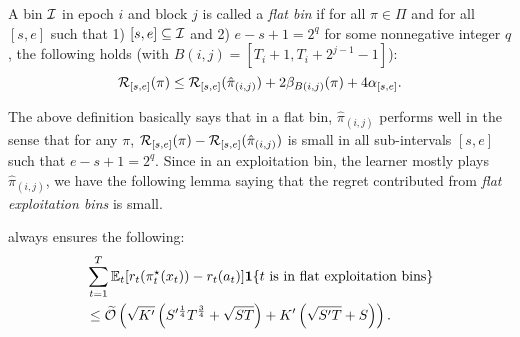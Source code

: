 \begin{definition}
A bin ${\mathcal{I}}$ in epoch $i$ and block $j$ is called a \textit{flat bin} if for all $\pi\in\Pi$ and for all $[s,e]$ such that 1) $[s,e] \subseteq {\mathcal{I}}$ and 2) $e-s+1=2^q$ for some nonnegative integer $q$, the following holds (with $B(i,j)=[T_i+1,T_i+2^{j-1}-1]$):
\begin{equation}
{\mathcal{R}}_{[s,e]}(\pi)\leq {\mathcal{R}}_{[s,e]}(\hat{\pi}_{(i,j)}) + 2\beta_{B(i,j)}(\pi)+4\alpha_{[s,e]}.
\end{equation}
\end{definition}
The above definition basically says that in a flat bin, $\hat{\pi}_{(i,j)}$ performs well in the sense that for any $\pi$, ${\mathcal{R}}_{[s,e]}(\pi)-{\mathcal{R}}_{[s,e]}(\hat{\pi}_{(i,j)})$ is small in all sub-intervals $[s,e]$ such that $e-s+1=2^q$. Since in an exploitation bin, the learner mostly plays $\hat{\pi}_{(i,j)}$, we have the following lemma saying that the regret contributed from \textit{flat exploitation bins} is small. 

\begin{lemma} 
\label{lemma:switch_flat_exploitation}
\AdaBIN always ensures the following:
\begin{align*}
&\sum_{t=1}^T \mathbb{E}_t[r_t(\pi^\star_t(x_t)) - r_t(a_t)] \boldsymbol{1}\{t \text{ is in flat exploitation bins}\} \\
&\leq \widetilde{\mathcal{O}}\left(\sqrt{K^\prime}\left(S^{\prime\frac{1}{4}}T^{\frac{3}{4}} + \sqrt{S T}\right) + K^\prime\left(\sqrt{S^\prime T} + S \right)\right). 
\end{align*}
\end{lemma}

